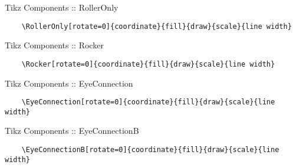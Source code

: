 \documentclass[9pt,xcolor={svgnames, x11names}]{beamer}
\begin{document}
\begin{frame}[fragile]{Tikz Components :: RollerOnly}
	
	\footnotesize
	\begin{verbatim}
    \RollerOnly[rotate=0]{coordinate}{fill}{draw}{scale}{line width}
  \end{verbatim}
	
	\vspace{1cm}
	
	
\end{frame}

\begin{frame}[fragile]{Tikz Components :: Rocker}
	
	\footnotesize
	\begin{verbatim}
    \Rocker[rotate=0]{coordinate}{fill}{draw}{scale}{line width}
  \end{verbatim}
	
	\vspace{1cm}
	
	
\end{frame}

\begin{frame}[fragile]{Tikz Components :: EyeConnection}
	
	\footnotesize
	\begin{verbatim}
    \EyeConnection[rotate=0]{coordinate}{fill}{draw}{scale}{line width}
  \end{verbatim}
	
	\vspace{1cm}
	
	
\end{frame}

\begin{frame}[fragile]{Tikz Components :: EyeConnectionB}
	
	\small
	\begin{verbatim}
    \EyeConnectionB[rotate=0]{coordinate}{fill}{draw}{scale}{line width}
  \end{verbatim}
	
	\vspace{1cm}
	
	
\end{frame}
\end{document}
